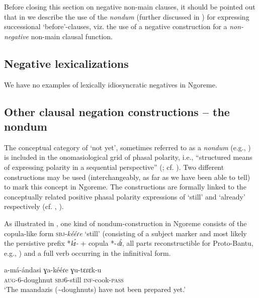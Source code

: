 \documentclass[output=paper,colorlinks,citecolor=brown,draftmode]{langscibook}
\begin{document}
Before closing this section on negative non-main clauses, it should be pointed out that in  we describe the use of the \textit{nondum} (further discussed in ) for expressing successional ‘before’-clauses, viz. the use of a negative construction for a \textit{non-negative} non-main clausal function.

\subsection{Negative lexicalizations}\label{sec:ngo:2.5}

We have no examples of lexically idiosyncratic negatives in Ngoreme. 

\subsection{Other clausal negation constructions – the nondum}\label{sec:ngo:2.6}


The conceptual category of ‘not yet’, sometimes referred to as a \textit{nondum} (e.g., \citealt{VeselinovaDevos2021}) is included in the onomasiological grid of phasal polarity, i.e., “structured means of expressing polarity in a sequential perspective” (\citealt[40]{Baar1997}; cf. \citealt{Kramer2017}). Two different constructions may be used (interchangeably, as far as we have been able to tell) to mark this concept in Ngoreme. The constructions are formally linked to the conceptually related positive phasal polarity expressions of ‘still’ and ‘already’ respectively (cf. \citealt{Kramer2017}, \citealt{VeselinovaDevos2021}). 

As illustrated in , one kind of nondum-construction in Ngoreme consists of the copula-like form \textsc{sbj}\nobreakdash-\textit{kééɾe} ‘still’ (consisting of a subject marker and most likely the persistive prefix *\textit{kɪ́-} + copula *\nobreakdash-\textit{dɪ̀}, all parts reconstructible for Proto-Bantu, e.g., \citealt[246--249]{Nurse2008}) and a full verb occurring in the infinitival form. 

\ea\label{ex:ngo:60} 
    \gll a{}-má-ándasi ɣa-kééɾe ɣu-tɛɾɛk-u\\ 
        \textsc{aug-}6-doughnut \textsc{sbj}6-still \textsc{inf}{}-cook-\textsc{pass}\\
    \glt ‘The maandazis ({\textasciitilde}doughnuts) have not been prepared yet.’
\z 
\end{document}
